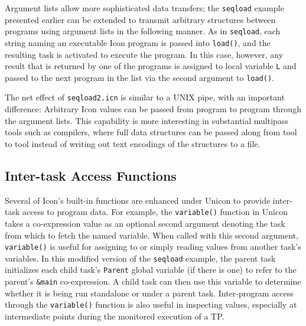 Argument lists allow more sophisticated data transfers; the {\tt seqload} 
example presented earlier can be extended to transmit arbitrary
structures between programs using argument lists in the following
manner.  As in {\tt seqload}, each string naming an executable Icon
program is passed into {\tt load()}, and the resulting task is
activated to execute the program.  In this case, however, any result
that is returned by one of the programs is assigned to local variable
{\tt L} and passed to the next program in the list via the second
argument to {\tt load()}.


The net effect of {\tt seqload2.icn} is similar to a UNIX pipe, with
an important difference: Arbitrary Icon values can be passed from
program to program through the argument lists.
This capability is more interesting in substantial multipass tools
such as compilers, where full data structures can be passed along from
tool to tool instead of writing out text encodings of the structures
to a file.

\subsection{Inter-task Access Functions}


Several of Icon's built-in functions are enhanced under Unicon
to provide inter-task access to program data.  For example, the
{\tt variable()} function in Unicon takes a co-expression value as an
optional second argument denoting the task from which to fetch the named
variable.  When called with this second argument, {\tt variable()} is
useful for assigning to or simply reading values from another task's
variables.  In this modified version of the {\tt seqload} example, the
parent task initializes each child task's {\tt Parent} global
variable (if there is one) to refer to the parent's {\tt \&main}
co-expression.  A child task can then use this variable to determine
whether it is being run standalone or under a parent task.
Inter-program access through the {\tt variable()} function is also
useful in inspecting values, especially at intermediate points during
the monitored execution of a TP.

